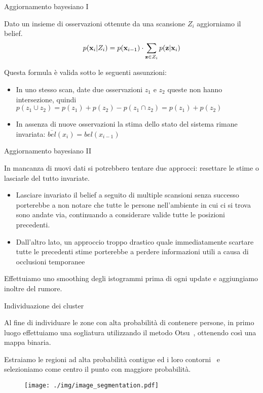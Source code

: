 \documentclass[10pt]{beamer}
\begin{document}
	\begin{frame}{Aggiornamento bayesiano I}
	
	Dato un insieme di osservazioni ottenute da una scansione $ Z_i $ aggiorniamo il belief.
	\begin{equation}\label{eq:belief-update}
		p({\bf x}_i | Z_i) = p({\bf x}_{i-1}) \cdot 
		\sum_{{\bf z} \in Z_i} p({\bf z} | {\bf x}_i)
	\end{equation}

	Questa formula è valida sotto le seguenti assunzioni:
	\begin{itemize}
		\pause\item In uno stesso scan, date due osservazioni $z_1$ e
			$z_2$ queste non hanno intersezione, quindi $ p(z_1 \cup z_2) =
			p(z_1)+p(z_2)-p( z_1 \cap z_2) = p(z_1)+p(z_2) $ 

		\pause\item In assenza di nuove osservazioni la stima dello stato del sistema
			rimane invariata: $ \overline{bel}(x_i) = bel(x_{i-1}) $ 

	\end{itemize}
	
	\end{frame}
	\begin{frame}{Aggiornamento bayesiano II}

	In mancanza di nuovi dati si potrebbero tentare due approcci:
	resettare le stime o lasciarle del tutto invariate. 
	\begin{itemize} 
		\pause\item Lasciare invariato il belief a seguito di multiple scansioni
			senza successo porterebbe a non notare che tutte le persone
			nell'ambiente in cui ci si trova sono andate via, continuando a
			considerare valide tutte le posizioni precedenti.
		\pause\item Dall'altro lato, un approccio troppo drastico quale
			immediatamente scartare tutte le precedenti stime porterebbe a
			perdere informazioni utili a causa di occlusioni temporanee
	\end{itemize}
	
	\pause Effettuiamo uno smoothing degli istogrammi
	prima di ogni update e aggiungiamo inoltre del rumore. 
	
	\end{frame}
	\begin{frame}{Individuazione dei cluster}
	
	Al fine di individuare le zone con alta probabilità di contenere persone, 
	in primo luogo effettuiamo una sogliatura utilizzando il metodo Otsu~\cite{otsu}, 
	ottenendo così una mappa binaria.
		
	Estraiamo le regioni ad alta probabilità contigue
	ed i loro contorni~\cite{contours} e selezioniamo come centro il punto
	con maggiore probabilità.

	\begin{figure}[H]
		\centering
		\texttt{[image: ./img/image\_segmentation.pdf]}
	\end{figure}

	\end{frame}
	
\end{document}
